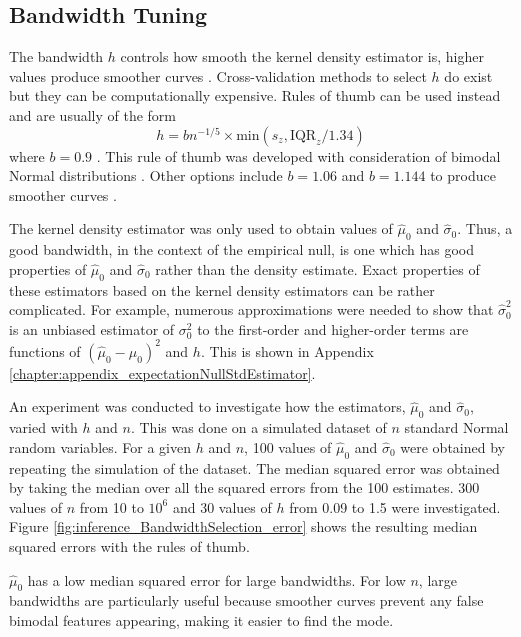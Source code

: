 \subsection{Bandwidth Tuning}

The bandwidth $h$ controls how smooth the kernel density estimator is, higher values produce smoother curves \citep{friedman2001elements}. Cross-validation methods to select $h$ do exist \citep{bowman1984alternative, sheather2004density} but they can be computationally expensive. Rules of thumb \citep{silverman1986density, sheather2004density} can be used instead and are usually of the form
\begin{equation}
  h = bn^{-1/5}\times\text{min}\left(s_z,\text{IQR}_z/1.34\right)
\end{equation}
where $b=0.9$ \citep{silverman1986density}. This rule of thumb was developed with consideration of bimodal Normal distributions \citep{silverman1986density}. Other options include $b=1.06$ and $b=1.144$ to produce smoother curves \citep{silverman1986density, sheather2004density}.

The kernel density estimator was only used to obtain values of $\widehat{\mu}_0$ and $\widehat{\sigma}_0$. Thus, a good bandwidth, in the context of the empirical null, is one which has good properties of $\widehat{\mu}_0$ and $\widehat{\sigma}_0$ rather than the density estimate. Exact properties of these estimators based on the kernel density estimators can be rather complicated. For example, numerous approximations were needed to show that $\widehat{\sigma}_0^2$ is an unbiased estimator of $\sigma_0^2$ to the first-order and higher-order terms are functions of $(\widehat{\mu}_0 - \mu_0)^2$ and $h$. This is shown in Appendix \ref{chapter:appendix_expectationNullStdEstimator}.

An experiment was conducted to investigate how the estimators, $\widehat{\mu}_0$ and $\widehat{\sigma}_0$, varied with $h$ and $n$. This was done on a simulated dataset of $n$ standard Normal random variables. For a given $h$ and $n$, 100 values of $\widehat{\mu}_0$ and $\widehat{\sigma}_0$ were obtained by repeating the simulation of the dataset. The median squared error was obtained by taking the median over all the squared errors from the 100 estimates. 300 values of $n$ from 10 to $10^6$ and 30 values of $h$ from 0.09 to 1.5 were investigated. Figure \ref{fig:inference_BandwidthSelection_error} shows the resulting median squared errors with the rules of thumb.

$\widehat{\mu}_0$ has a low median squared error for large bandwidths. For low $n$, large bandwidths are particularly useful because smoother curves prevent any false bimodal features appearing, making it easier to find the mode.

